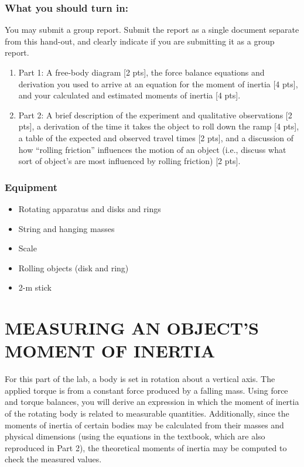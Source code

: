 \documentclass[11pt,letterpaper]{article}
\begin{document}
\subsubsection*{What you should turn in:} 
You may submit a group report. Submit the report as a single document separate from this hand-out, and clearly indicate if you are submitting it as a group report.
\begin{enumerate}
\setlength{\parskip}{3pt}
\item Part 1: A free-body diagram [2 pts], the force balance equations and derivation you used to arrive at an equation for the moment of inertia [4 pts], and your calculated and estimated moments of inertia [4 pts].
\item Part 2: A brief description of the experiment and qualitative observations [2 pts], a derivation of the time it takes the object to roll down the ramp [4 pts], a table of the expected and observed travel times [2 pts], and a discussion of how ``rolling friction'' influences the motion of an object (i.e., discuss what sort of object's are most influenced by rolling friction) [2 pts].
\end{enumerate}

\subsubsection*{Equipment}
\begin{itemize}
\setlength{\parskip}{3pt}
\item Rotating apparatus and disks and rings
\item String and hanging masses
\item Scale
\item Rolling objects (disk and ring)
\item 2-m stick
\end{itemize}

\section{MEASURING AN OBJECT'S MOMENT OF INERTIA}
For this part of the lab, a body is set in rotation about a vertical axis.  The applied
torque is from a constant force produced by a falling mass. Using force and torque balances, you will derive an expression in which the moment of inertia of the rotating body is related to measurable quantities. Additionally, since the moments of inertia of certain bodies may be calculated from their masses and physical dimensions (using the equations in the textbook, which are also reproduced in Part 2), the theoretical moments of inertia may be computed to check the measured values.
\end{document}
